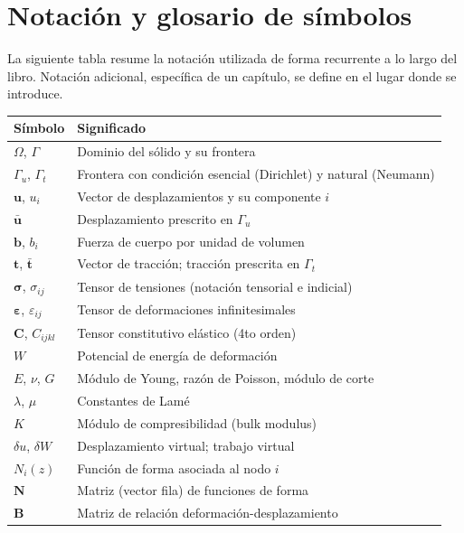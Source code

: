 \chapter*{Notación y glosario de símbolos}

La siguiente tabla resume la notación utilizada de forma recurrente a lo largo del libro. Notación adicional, específica de un capítulo, se define en el lugar donde se introduce.

\renewcommand{\arraystretch}{1.35}
\begin{center}
\begin{tabular}{@{}ll@{}}
\toprule
\textbf{Símbolo} & \textbf{Significado} \\
\midrule
$\Omega$, $\Gamma$ & Dominio del sólido y su frontera \\
$\Gamma_u$, $\Gamma_t$ & Frontera con condición esencial (Dirichlet) y natural (Neumann) \\
$\bm{u}$, $u_i$ & Vector de desplazamientos y su componente $i$ \\
$\bar{\bm{u}}$ & Desplazamiento prescrito en $\Gamma_u$ \\
$\bm{b}$, $b_i$ & Fuerza de cuerpo por unidad de volumen \\
$\bm{t}$, $\bar{\bm t}$ & Vector de tracción; tracción prescrita en $\Gamma_t$ \\
$\bm{\sigma}$, $\sigma_{ij}$ & Tensor de tensiones (notación tensorial e indicial) \\
$\bm{\varepsilon}$, $\varepsilon_{ij}$ & Tensor de deformaciones infinitesimales \\
$\bm{C}$, $C_{ijkl}$ & Tensor constitutivo elástico (4to orden) \\
$W$ & Potencial de energía de deformación \\
$E$, $\nu$, $G$ & Módulo de Young, razón de Poisson, módulo de corte \\
$\lambda$, $\mu$ & Constantes de Lamé \\
$K$ & Módulo de compresibilidad (bulk modulus) \\
$\delta u$, $\delta W$ & Desplazamiento virtual; trabajo virtual \\
$N_i(z)$ & Función de forma asociada al nodo $i$ \\
$\mathbf{N}$ & Matriz (vector fila) de funciones de forma \\
$\mathbf{B}$ & Matriz de relación deformación-desplazamiento \\

\end{tabular}
\end{center}
